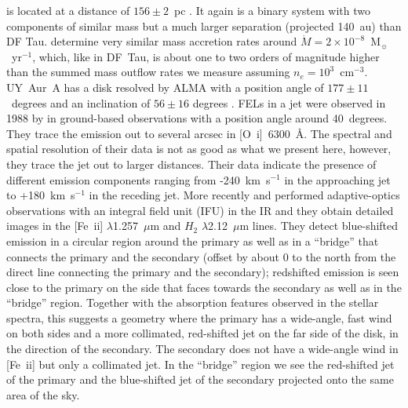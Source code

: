 \documentclass[twocolumn,trackchanges]{aastex63}
\begin{document}
 is located at a distance of $156\pm2$~pc
\citep{2016A&A...595A...1G,2018A&A...616A...1G}. It again is a binary system
with two components of similar mass \citep[M0 and M2,
  see][]{2003ApJ...583..334H} but a much larger separation (projected 140~au)
than DF Tau. \citet{2003ApJ...583..334H} determine very similar mass accretion
rates around $\dot M=2\times10^{-8}$~M$_{\sun}$~yr$^{-1}$, which, like in
DF~Tau, is about one to two orders of magnitude higher than the summed mass
outflow rates we measure assuming $n_e=10^3$~cm$^{-3}$.  UY~Aur~A has a disk
resolved by ALMA with a position angle of $177\pm11$~degrees and an inclination
of $56\pm16$ degrees \citep{2014ApJ...784...62A}. FELs in a jet were observed
in 1988 by \citet{1997A&AS..126..437H} in ground-based observations with a
position angle around 40~degrees. They trace the emission out to several arcsec
in [O~{\sc i}]~6300~\AA{}. The spectral and spatial resolution of their data is
not as good as what we present here, however, they trace the jet out to larger
distances. Their data indicate the presence of different emission components
ranging from -240~km~s$^{-1}$ in the approaching jet to +180~km~s$^{-1}$ in the
receding jet. More recently \citet{2014ApJ...786...63P} and
\citet{2019ApJ...884..159B} performed adaptive-optics observations with an
integral field unit (IFU) in the IR and they obtain detailed images in the
[Fe~{\sc ii}] $\lambda$1.257~$\mu$m and $H_2$ $\lambda$2.12~$\mu$m
  lines. They detect blue-shifted emission in a circular region around the
primary as well as in a ``bridge'' that connects the primary and the secondary
(offset by about 0 to the north from the direct line connecting the
primary and the secondary); redshifted emission is seen close to the primary on
the side that faces towards the secondary as well as in the ``bridge''
region. Together with the absorption features observed in the stellar spectra,
this suggests a geometry where the primary has a wide-angle, fast wind on both
sides and a more collimated, red-shifted jet on the far side of the disk, in
the direction of the secondary. The secondary does not have a wide-angle wind
in [Fe~{\sc ii}] but only a collimated jet. In the ``bridge'' region we see the
red-shifted jet of the primary and the blue-shifted jet of the secondary
projected onto the same area of the sky.
\end{document}
